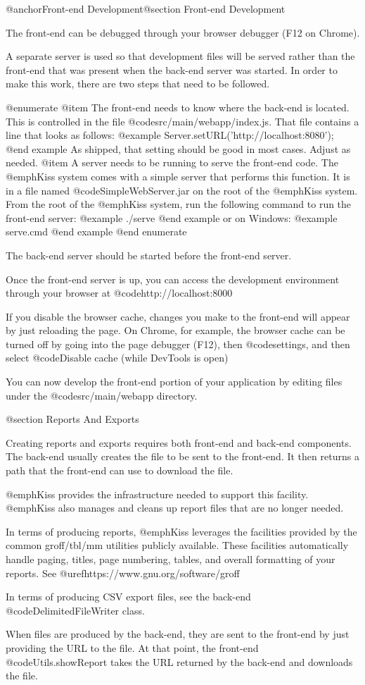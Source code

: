 @anchor{Front-end Development}@section Front-end Development

The front-end can be debugged through your browser debugger (F12 on Chrome).

A separate server is used so that development files will be served
rather than the front-end that was present when the back-end server
was started.  In order to make this work, there are two steps that
need to be followed.

@enumerate
@item
The front-end needs to know where the back-end is located.  This is controlled in the file @code{src/main/webapp/index.js}.
That file contains a line that looks as follows:
@example
    Server.setURL('http://localhost:8080');
@end example
As shipped, that setting should be good in most cases.  Adjust as needed.
@item
A server needs to be running to serve the front-end code.  The
@emph{Kiss} system comes with a simple server that performs this
function.  It is in a file named @code{SimpleWebServer.jar} on the
root of the @emph{Kiss} system.  From the root of the @emph{Kiss}
system, run the following command to run the front-end server:
@example
   ./serve
@end example
or on Windows:
@example
   serve.cmd
@end example
@end enumerate

The back-end server should be started before the front-end server.

Once the front-end server is up, you can access the development
environment through your browser at @code{http://localhost:8000}

If you disable the browser cache, changes you make to the front-end
will appear by just reloading the page.  On Chrome, for example, the
browser cache can be turned off by going into the page debugger (F12),
then @code{settings}, and then select @code{Disable cache (while
DevTools is open)}

You can now develop the front-end portion of your application by
editing files under the @code{src/main/webapp} directory.

@section Reports And Exports

Creating reports and exports requires both front-end and back-end components.
The back-end usually creates the file to be sent to the front-end.  It then returns
a path that the front-end can use to download the file.

@emph{Kiss} provides the infrastructure needed to support this facility.
@emph{Kiss} also manages and cleans up report files that are no longer needed.

In terms of producing reports, @emph{Kiss} leverages the facilities
provided by the common groff/tbl/mm utilities publicly available.
These facilities automatically handle paging, titles, page numbering,
tables, and overall formatting of your reports. See
@uref{https://www.gnu.org/software/groff}

In terms of producing CSV export files, see the back-end
@code{DelimitedFileWriter} class.

When files are produced by the back-end, they are sent to the
front-end by just providing the URL to the file.  At that point, the
front-end @code{Utils.showReport} takes the URL returned by the back-end
and downloads the file.
